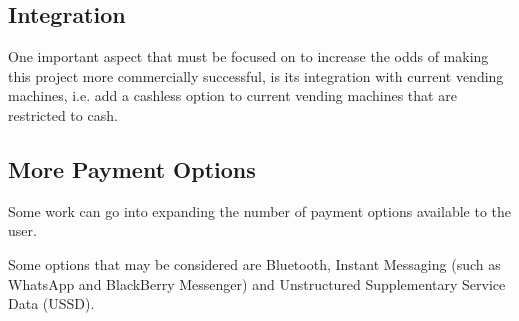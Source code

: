 \subsection{Integration}

One important aspect that must be focused on to increase the odds of making this project
more commercially successful, is its integration with current vending machines, i.e. add a
cashless option to current vending machines that are restricted to cash.

\subsection{More Payment Options}

Some work can go into expanding the number of payment options available to the user.

Some options that may be considered are Bluetooth, Instant Messaging (such as WhatsApp and
BlackBerry Messenger) and Unstructured Supplementary Service Data (USSD).
